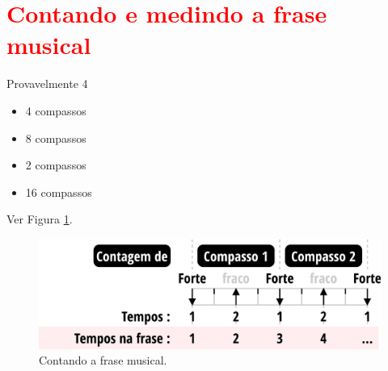 \section{\textcolor{red}{Contando e medindo a frase musical}}
Provavelmente 4
\begin{itemize}
\item 4 compassos
\item 8 compassos
\item 2 compassos
\item 16 compassos
\end{itemize}


Ver Figura \ref{fig:contagemtemposfrase}.
\begin{figure}
    \centering
    \includegraphics[width=\textwidth]{chapters/cap-musicalidade/contagemtemposfrase.eps}
    \caption{Contando a frase musical.}
    \label{fig:contagemtemposfrase}
\end{figure}


